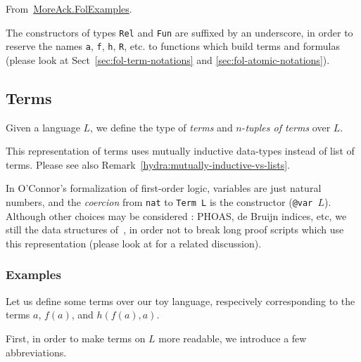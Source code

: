 From~\href{../theories/html/hydras.MoreAck.FolExamples.html}{MoreAck.FolExamples}.


\begin{remark}
  \label{rem:underscores}
  The constructors of types \texttt{Rel} and \texttt{Fun} are suffixed by an underscore, in order to reserve the names \texttt{a}, \texttt{f}, \texttt{h}, \texttt{R}, etc. to functions which build terms and formulas (please look at Sect~\ref{sec:fol-term-notations} and \ref{sec:fol-atomic-notations}).
\end{remark}


\subsection{Terms}

Given a language $L$, we define the type of \emph{terms} and
$n$-\emph{tuples of terms} over $L$.


\begin{remark}
This representation of terms uses mutually inductive data-types instead of list of terms. Please see also Remark~\ref{hydra:mutually-inductive-vs-lists}.
\end{remark}


\begin{remark}[Variables]
In O'Connor's formalization of first-order logic,  variables are 
just natural numbers, and the \emph{coercion} from
\texttt{nat} to \texttt{Term L} is the constructor (\texttt{@var $L$}).
Although other choices may be considered : PHOAS, de Bruijn indices, etc,  we still the data structures of~\cite{Goedel}, in order not to break long proof scripts which use this representation (please look at \cite{OConnor05} for a related discussion).
  
\end{remark}




\subsubsection{Examples}
\label{sect:folTermExamples}


Let us define some \gallina terms over our toy language, respecively corresponding to the terms $a$,
$f(a)$, and $h(f(a),a)$.

First, in order to make terms on $L$ more readable, we introduce a few abbreviations.


